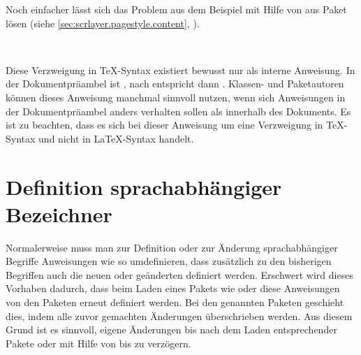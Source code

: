 Noch einfacher lässt sich das Problem aus dem Beispiel %
\iffalse übrigens \fi %
mit Hilfe von  aus Paket
\hyperref[cha:scrlayer]{} lösen (siehe
\autoref{sec:scrlayer.pagestyle.content},
).%
\EndIndexGroup


\begin{Declaration}[0]
  \ \ %
  \  
\end{Declaration}
\iftrue%
Diese Verzweigung in \TeX-Syntax existiert bewusst nur als interne
Anweisung. In der Dokumentpräambel ist 
, nach  entspricht
 dann .  Klassen- und Paketautoren
können dieses Anweisung manchmal sinnvoll nutzen, %
\else%
In der Dokumentpräambel enspricht \Macro{if@atdocument} \iftrue dem Schalter
\fi \Macro{iffalse}, nach \Macro{begin}\PParameter{document} hingegen
\Macro{iftrue}.  Klassen- und Paketautoren können dieses Anweisung nutzen, %
\fi%
wenn sich Anweisungen in der Dokumentpräambel anders verhalten sollen als
innerhalb des Dokuments. Es ist zu beachten, dass es sich
bei dieser Anweisung um eine Verzweigung in \TeX-Syntax und nicht in
\LaTeX-Syntax handelt.%
\EndIndexGroup


\section{Definition sprachabhängiger Bezeichner}
\BeginIndexGroup
{}

\iffalse%
Anfänger haben häufig Probleme damit, sprachabhängige Begriffe wie
\Macro{listfigurename}\IndexCmd{listfigurename}, in der Voreinstellung meist
»List of Figures« beziehungsweise in Deutsch: »Abbildungsverzeichnis«, zu
ändern. Werden diese beispielsweise einfach mit \Macro{renewcommand} in der
Dokumentpräambel umdefiniert, so überleben sie eine spätere Umschaltung der
Sprache nicht. Bei Verwendung von \Package{babel}\IndexCmd{babel} wird die
Umdefinierung in der Dokumentpräambel bereits von
\Macro{begin}\PParameter{document} wieder überschrieben.
\fi

Normalerweise muss man zur Definition oder zur Änderung sprachabhängiger
Begriffe Anweisungen wie  so umdefinieren, dass
zusätzlich zu den bisherigen Begriffen auch die neuen oder geänderten
definiert werden. Erschwert wird dieses Vorhaben dadurch, dass beim Laden
eines Pakets wie  oder
 diese Anweisungen von den
Paketen erneut definiert werden. Bei den genannten Paketen geschieht dies,
indem alle zuvor gemachten Änderungen überschrieben werden. Aus diesem Grund
ist es sinnvoll, eigene Änderungen bis nach dem Laden entsprechender Pakete
oder mit Hilfe von  bis
 zu verzögern.

